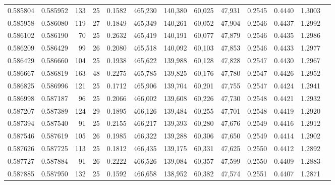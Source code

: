 \begin{tabular}{rrrrrrrrrrrrr}
0.585804 & 0.585952 &    133 &    25 &                                     0.1582 & 465,230 & 140,380 &  60,025 &  47,931 & 0.2545 & 0.4440 & 1.3003 \\
0.585958 & 0.586080 &    119 &    27 &                                     0.1849 & 465,349 & 140,261 &  60,052 &  47,904 & 0.2546 & 0.4437 & 1.2992 \\
0.586102 & 0.586190 &     70 &    25 &                                     0.2632 & 465,419 & 140,191 &  60,077 &  47,879 & 0.2546 & 0.4435 & 1.2986 \\
0.586209 & 0.586429 &     99 &    26 &                                     0.2080 & 465,518 & 140,092 &  60,103 &  47,853 & 0.2546 & 0.4433 & 1.2977 \\
0.586429 & 0.586660 &    104 &    25 &                                     0.1938 & 465,622 & 139,988 &  60,128 &  47,828 & 0.2547 & 0.4430 & 1.2967 \\
0.586667 & 0.586819 &    163 &    48 &                                     0.2275 & 465,785 & 139,825 &  60,176 &  47,780 & 0.2547 & 0.4426 & 1.2952 \\
0.586825 & 0.586996 &    121 &    25 &                                     0.1712 & 465,906 & 139,704 &  60,201 &  47,755 & 0.2547 & 0.4424 & 1.2941 \\
0.586998 & 0.587187 &     96 &    25 &                                     0.2066 & 466,002 & 139,608 &  60,226 &  47,730 & 0.2548 & 0.4421 & 1.2932 \\
0.587207 & 0.587389 &    124 &    29 &                                     0.1895 & 466,126 & 139,484 &  60,255 &  47,701 & 0.2548 & 0.4419 & 1.2920 \\
0.587394 & 0.587540 &     91 &    25 &                                     0.2155 & 466,217 & 139,393 &  60,280 &  47,676 & 0.2549 & 0.4416 & 1.2912 \\
0.587546 & 0.587619 &    105 &    26 &                                     0.1985 & 466,322 & 139,288 &  60,306 &  47,650 & 0.2549 & 0.4414 & 1.2902 \\
0.587626 & 0.587725 &    113 &    25 &                                     0.1812 & 466,435 & 139,175 &  60,331 &  47,625 & 0.2550 & 0.4412 & 1.2892 \\
0.587727 & 0.587884 &     91 &    26 &                                     0.2222 & 466,526 & 139,084 &  60,357 &  47,599 & 0.2550 & 0.4409 & 1.2883 \\
0.587885 & 0.587950 &    132 &    25 &                                     0.1592 & 466,658 & 138,952 &  60,382 &  47,574 & 0.2551 & 0.4407 & 1.2871 \\

\end{tabular}

